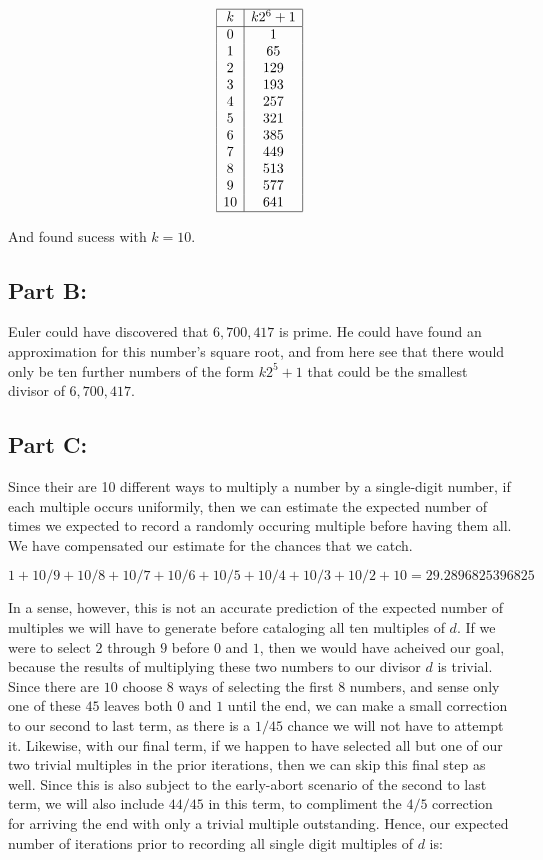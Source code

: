 \documentclass[12pt]{article}
\theoremstyle{moo}
\begin{document}
\[
\begin{array}{|c|c|}
\hline
k&k2^6+1\\
\hline
0&1\\
1&65\\
2&129\\
3&193\\
4&257\\
5&321\\
6&385\\
7&449\\
8&513\\
9&577\\
10&641\\
\hline
\end{array}
\]

And found sucess with $k=10$.



\subsection*{Part B:}
Euler could have discovered that $6,700,417$ is prime. He could have found an approximation for this number's square root, and from here see that there would only be ten further numbers of the form $k2^5+1$ that could be the smallest divisor of $6,700,417$.


\subsection*{Part C:}

Since their are 10 different ways to multiply a number by a single-digit number, if each multiple occurs uniformily, then we can estimate the expected number of times we expected to record a randomly occuring multiple before having them all. We have compensated our estimate for the chances that we catch.

\[
1 + 10/9 + 10/8 + 10/7 + 10/6 + 10/5 + 10/4 + 10/3 + 10/2 + 10 = 29.2896825396825
\]

In a sense, however, this is not an accurate prediction of the expected number of multiples we will have to generate before cataloging all ten multiples of $d$. If we were to select $2$ through $9$ before $0$ and $1$, then we would have acheived our goal, because the results of multiplying these two numbers to our divisor $d$ is trivial. Since there are $10$ choose $8$ ways of selecting the first $8$ numbers, and sense only one of these $45$ leaves both $0$ and $1$ until the end, we can make a small correction to our second to last term, as there is a $1/45$ chance we will not have to attempt it. Likewise, with our final term, if we happen to have selected all but one of our two trivial multiples in the prior iterations, then we can skip this final step as well. Since this is also subject to the early-abort scenario of the second to last term, we will also include $44/45$ in this term, to compliment the $4/5$ correction for arriving the end with only a trivial multiple outstanding. Hence, our expected number of iterations prior to recording all single digit multiples of $d$ is:
\end{document}
